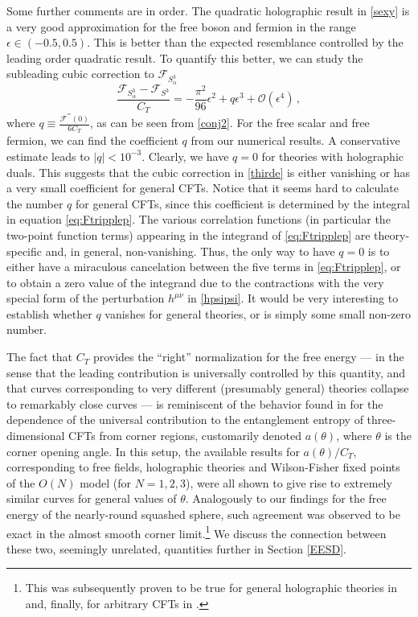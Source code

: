 \documentclass[12pt]{article}
\numberwithin{equation}{section}
\newcommand{\ssc}{\scriptscriptstyle}
\newcommand{\ctt}{C_{\ssc T}}
\begin{document}
Some further comments are in order. The quadratic holographic result in \eqref{sexy} is a very good approximation for the free boson and fermion in the range $\epsilon \in (-0.5,0.5)$. This is better than the expected resemblance controlled by the leading order quadratic result. To quantify this better, we can study the subleading cubic correction to $\mathcal{F}_{S^3_{\alpha}}$
%
\begin{equation}\label{thirde}
\frac{\mathcal{F}_{S^3_{\alpha}}-\mathcal{F}_{S^3}}{\ctt}= -\frac{\pi^2}{96} \epsilon^2 +q\epsilon^3 + \mathcal{O}\left(\epsilon^4\right)\, ,
\end{equation}
%
where $q\equiv\frac{\mathcal{F}^{'''}(0)}{6\ctt}$, as can be seen from \eqref{conj2}. For the free scalar and free fermion, we can find the coefficient $q$ from our numerical results. A conservative estimate leads to $|q|<10^{-3}$. Clearly, we have $q=0$ for theories with holographic duals. This suggests that the cubic correction in \eqref{thirde} is either vanishing or has a very small coefficient for general CFTs. Notice that it seems hard to calculate the number $q$ for general CFTs, since this coefficient is determined by the integral in equation \eqref{eq:Ftripplep}. The various correlation functions (in particular the two-point function terms) appearing in the integrand of \eqref{eq:Ftripplep} are theory-specific and, in general, non-vanishing. Thus, the only way to have $q=0$ is to either have a miraculous cancelation between the five terms in \eqref{eq:Ftripplep}, or to obtain a zero value of the integrand due to the contractions with the very special form of the perturbation $h^{\mu\nu}$ in \eqref{hpsipsi}. It would be very interesting to establish whether $q$ vanishes for general theories, or is simply some small non-zero number.

The fact that $\ctt$ provides the ``right'' normalization for the free energy --- in the sense that the leading contribution is universally controlled by this quantity, and that curves corresponding to very different (presumably general) theories collapse to remarkably close curves --- is reminiscent of the behavior found in \cite{Bueno1,Bueno2} for the dependence of the universal contribution to the entanglement entropy of three-dimensional CFTs from corner regions, customarily denoted $a(\theta)$, where $\theta$ is the corner opening angle. In this setup, the available results for $a(\theta)/\ctt$, corresponding to free fields, holographic theories and Wilson-Fisher fixed points of the $O(N)$ model (for $N=1,2,3$), were all shown to give rise to extremely similar curves for general values of $\theta$. Analogously to our findings for the free energy of the nearly-round squashed sphere, such agreement was observed to be exact in the almost smooth corner limit.\footnote{This was subsequently proven to be true for general holographic theories in \cite{Miao2015,Bueno4} and, finally, for arbitrary CFTs in \cite{faulkner15}.} We discuss the connection between these two, seemingly unrelated, quantities further in Section \ref{EESD}. 
\end{document}
